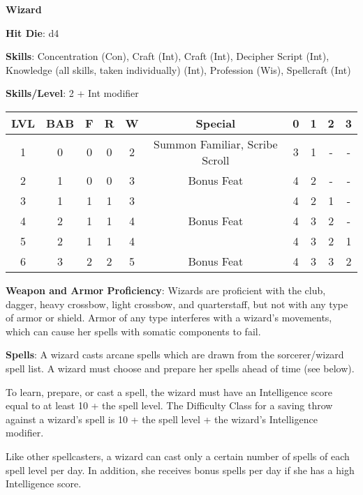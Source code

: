 \textbf{\huge{Wizard}}

\textbf{Hit Die}: d4

\textbf{Skills}: Concentration (Con), Craft (Int), Craft (Int), Decipher Script (Int), Knowledge (all skills, taken individually) (Int), Profession (Wis), Spellcraft (Int)

\textbf{Skills/Level}: 2 + Int modifier

\begin{center}
\begin{adjustwidth}{-4cm}{}
\begin{small}
\begin{tabular}{| c | c | c | c | c | c | c | c | c | c |}
\hline
LVL &BAB &F &R &W &Special &0 &1 &2 &3 \\
\hline
1 &0 &0 &0 &2 &Summon Familiar, Scribe Scroll &3 &1 &- &- \\
2 &1 &0 &0 &3 &Bonus Feat &4 &2 &- &- \\
3 &1 &1 &1 &3 & &4 &2 &1 &- \\
4 &2 &1 &1 &4 &Bonus Feat &4 &3 &2 &- \\
5 &2 &1 &1 &4 & &4 &3 &2 &1 \\
6 &3 &2 &2 &5 &Bonus Feat &4 &3 &3 &2 \\
\hline
\end{tabular}
\end{small}
\end{adjustwidth}
\end{center}

\textbf{Weapon and Armor Proficiency}: Wizards are proficient with the club, dagger, heavy crossbow, light crossbow, and quarterstaff, but not with any type of armor or shield. Armor of any type interferes with a wizard’s movements, which can cause her spells with somatic components to fail.

\textbf{Spells}: A wizard casts arcane spells which are drawn from the sorcerer/wizard spell list. A wizard must choose and prepare her spells ahead of time (see below).

To learn, prepare, or cast a spell, the wizard must have an Intelligence score equal to at least 10 + the spell level. The Difficulty Class for a saving throw against a wizard’s spell is 10 + the spell level + the wizard’s Intelligence modifier.

Like other spellcasters, a wizard can cast only a certain number of spells of each spell level per day. In addition, she receives bonus spells per day if she has a high Intelligence score.

